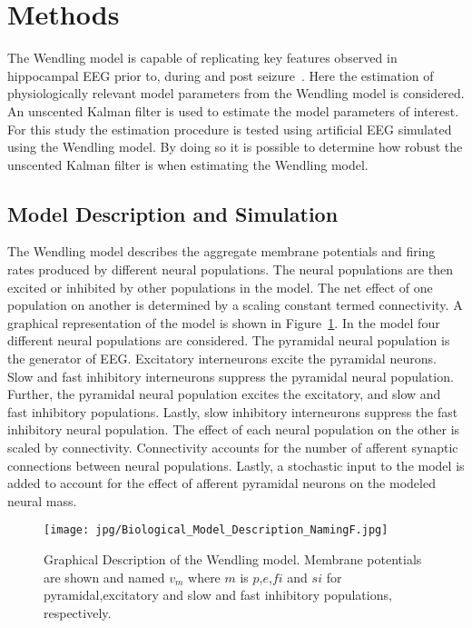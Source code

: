 \section{Methods}

The Wendling model is capable of replicating key features observed in hippocampal EEG prior to, during and post seizure~\citep{wendling2002epileptic}. Here the estimation of physiologically relevant model parameters from the Wendling model is considered. An unscented Kalman filter is used to estimate the model parameters of interest. For this study the estimation procedure is tested using artificial EEG simulated using the Wendling model. By doing so it is possible to determine how robust the unscented Kalman filter is when estimating the Wendling model.

\subsection{Model Description and Simulation} %

The Wendling model describes the aggregate membrane potentials and firing rates produced by different neural populations. The neural populations are then excited or inhibited by other populations in the model. The net effect of one population on another is determined by a scaling constant termed connectivity. A graphical representation of the model is shown in Figure~\ref{fig: Biological}. In the model four different neural populations are considered. The pyramidal neural population is the generator of EEG. Excitatory interneurons excite the pyramidal neurons. Slow and fast inhibitory interneurons suppress the pyramidal neural population. Further, the pyramidal neural population excites the excitatory, and slow and fast inhibitory populations. Lastly, slow inhibitory interneurons suppress the fast inhibitory neural population. The effect of each neural population on the other is scaled by connectivity. Connectivity accounts for the number of afferent synaptic connections between neural populations.  Lastly, a stochastic input to the model is added to account for the effect of afferent pyramidal neurons on the modeled neural mass.%
\begin{figure}  %
	\centering
		\texttt{[image: jpg/Biological\_Model\_Description\_NamingF.jpg]}
	\caption{Graphical Description of the Wendling model. Membrane potentials are shown and named $v_{m}$ where $m$ is $p$,$e$,$fi$ and $si$ for pyramidal,excitatory and slow and fast inhibitory populations, respectively.}
	\label{fig: Biological}
\end{figure}%

